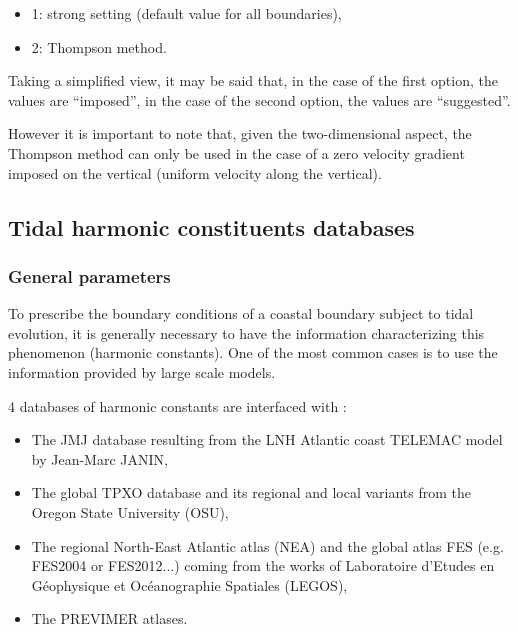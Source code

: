 \begin{itemize}
\item 1: strong setting (default value for all boundaries),

\item 2: Thompson method.
\end{itemize}

Taking a simplified view, it may be said that, in the case of the first
option, the values are ``imposed'', in the case of the second option, the
values are ``suggested''.

However it is important to note that, given the two-dimensional aspect, the
Thompson method can only be used in the case of a zero velocity gradient
imposed on the vertical (uniform velocity along the vertical).


\subsection{Tidal harmonic constituents databases}
\label{sec:tide}


\subsubsection{General parameters}

To prescribe the boundary conditions of a coastal boundary subject to tidal
evolution, it is generally necessary to have the information characterizing
this phenomenon (harmonic constants). One of the most common cases is to use
the information provided by large scale models.

4 databases of harmonic constants are interfaced with :

\begin{itemize}
\item The JMJ database resulting from the LNH Atlantic coast TELEMAC model
by Jean-Marc JANIN,

\item The global TPXO database and its regional and local variants from
the Oregon State University (OSU),

\item The regional North-East Atlantic atlas (NEA) and the global atlas
FES (e.g. FES2004 or FES2012...) coming from the works of Laboratoire
d'Etudes en Géophysique et Océanographie Spatiales (LEGOS),

\item The PREVIMER atlases.
\end{itemize}

